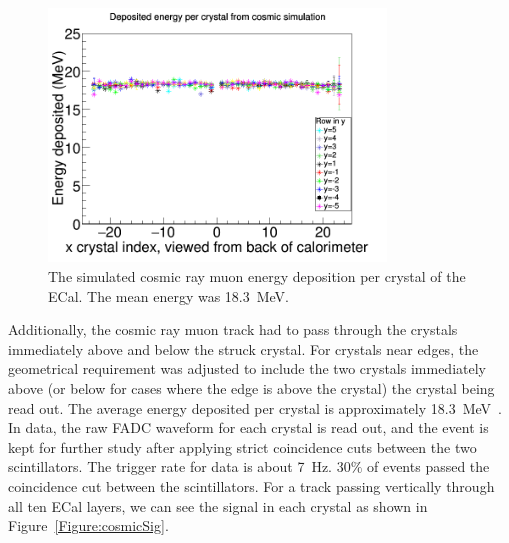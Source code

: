 \begin{figure}[htb]
  \centering
      \includegraphics[width=0.8\textwidth]{pics/performance/cosmicEdep.png}
  \caption[Simulation of energy deposited per ECal module from cosmic rays]{The simulated cosmic ray muon energy deposition per crystal of the ECal. The mean energy was 18.3~MeV.}
  \label{Figure:cosmicEdep}
\end{figure}
Additionally, the cosmic ray muon track had to pass through the crystals immediately above and below the struck crystal. For crystals near edges, the geometrical requirement was adjusted to include the two crystals immediately above (or below for cases where the edge is above the crystal) the crystal being read out. The average energy deposited per crystal is approximately 18.3~MeV~\cite{Agashe:2014kda}. In data, the raw FADC waveform for each crystal is read out, and the event is kept for further study after applying strict coincidence cuts between the two scintillators. The trigger rate for data is about 7~Hz. 30$\%$ of events passed the coincidence cut between the scintillators. For a track passing vertically through all ten ECal layers, we can see the signal in each crystal as shown in Figure~\ref{Figure:cosmicSig}.

